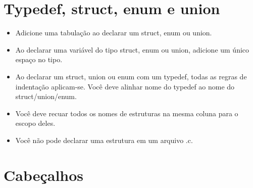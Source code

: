 \documentclass{42-pt}
\begin{document}
    \section{Typedef, struct, enum e union}

        \begin{itemize}

            \item Adicione uma tabulação ao declarar um struct, enum ou union.

            \item Ao declarar uma variável do tipo struct, enum ou union,
                adicione um único espaço no tipo.

            \item Ao declarar um struct, union ou enum com um typedef,
                todas as regras de indentação aplicam-se. Você deve alinhar nome
                do typedef ao nome do struct/union/enum.

            \item Você deve recuar todos os nomes de estruturas na mesma coluna
                para o escopo deles.

            \item Você não pode declarar uma estrutura em um arquivo .c.

        \end{itemize}
        \newpage


    \section{Cabeçalhos}
\end{document}

